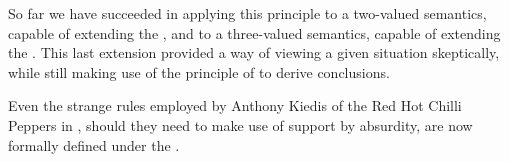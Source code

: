 So far we have succeeded in applying this principle to a two-valued semantics, capable of extending the \sms, and to a three-valued semantics, capable of extending the \wfs. This last extension provided a way of viewing a given situation skeptically, while still making use of the principle of \raa to derive conclusions.

Even the strange rules employed by Anthony Kiedis of the Red Hot Chilli Peppers in \cite{californication}, should they need to make use of support by absurdity, are now formally defined under the \RWFS.

\incrementmtc

